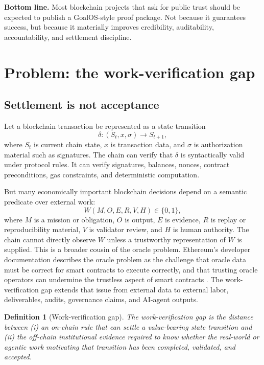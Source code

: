 \documentclass[11pt]{article}
\newtheorem{definition}{Definition}[section]
\newcommand{\onchain}{on-chain}
\newcommand{\offchain}{off-chain}
\begin{document}
\begin{executivebox}
\textbf{Bottom line.} Most blockchain projects that ask for public trust should be expected to publish a GoalOS-style proof package. Not because it guarantees success, but because it materially improves credibility, auditability, accountability, and settlement discipline.
\end{executivebox}

\section{Problem: the work-verification gap}

\subsection{Settlement is not acceptance}

Let a blockchain transaction be represented as a state transition
\[
  \delta: (S_t, x, \sigma) \rightarrow S_{t+1},
\]
where $S_t$ is current chain state, $x$ is transaction data, and $\sigma$ is authorization material such as signatures. The chain can verify that $\delta$ is syntactically valid under protocol rules. It can verify signatures, balances, nonces, contract preconditions, gas constraints, and deterministic computation.

But many economically important blockchain decisions depend on a semantic predicate over external work:
\[
  W(M, O, E, R, V, H) \in \{0,1\},
\]
where $M$ is a mission or obligation, $O$ is output, $E$ is evidence, $R$ is replay or reproducibility material, $V$ is validator review, and $H$ is human authority. The chain cannot directly observe $W$ unless a trustworthy representation of $W$ is supplied. This is a broader cousin of the oracle problem. Ethereum's developer documentation describes the oracle problem as the challenge that oracle data must be correct for smart contracts to execute correctly, and that trusting oracle operators can undermine the trustless aspect of smart contracts \citep{ethereumOracles}. The work-verification gap extends that issue from external data to external labor, deliverables, audits, governance claims, and AI-agent outputs.

\begin{definition}[Work-verification gap]
The \emph{work-verification gap} is the distance between (i) an \onchain{} rule that can settle a value-bearing state transition and (ii) the \offchain{} institutional evidence required to know whether the real-world or agentic work motivating that transition has been completed, validated, and accepted.
\end{definition}
\end{document}
